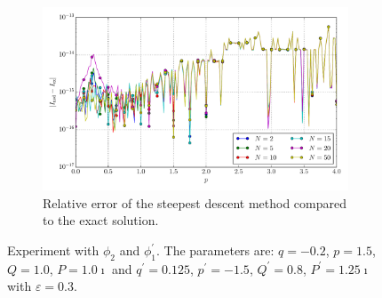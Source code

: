 \documentclass[a4paper,10pt]{article}
\begin{document}
\begin{figure}[ht!]
\begin{subfigure}[t]{0.5\linewidth}
    \includegraphics[width=\linewidth]{./plots/tp_1d_conv_p_2_1_err_rel_nsd.pdf}
    \caption{Relative error of the steepest descent method compared to the exact solution.}
    \label{fig:tp_1d_conv_p_2_1_err_nsd}
  \end{subfigure}
  \label{fig:tp_1d_conv_p_2_1}
  \caption{Experiment with $\phi_{2}$ and $\phi_{1}^{\prime}$.
  The parameters are:
  $q=-0.2$, $p=1.5$, $Q=1.0$, $P=1.0\imath$ and
  $q^\prime=0.125$, $p^\prime=-1.5$, $Q^\prime=0.8$, $P^\prime=1.25\imath$
  with $\varepsilon = 0.3$.}
\end{figure}
\end{document}
